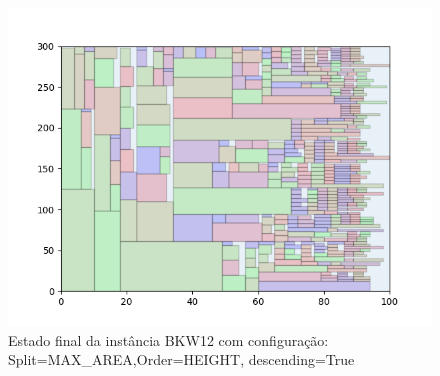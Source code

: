 \begin{figure}[H]
    \centering
    \caption[]{Estado final da instância BKW12 com configuração: Split=MAX_AREA,Order=HEIGHT, descending=True}
    \label{fig:bkw12-max_area-height-true}
    \includegraphics[scale=0.5]{output/figures/bkw/bkw12/max_area/height/true/000}
\end{figure}